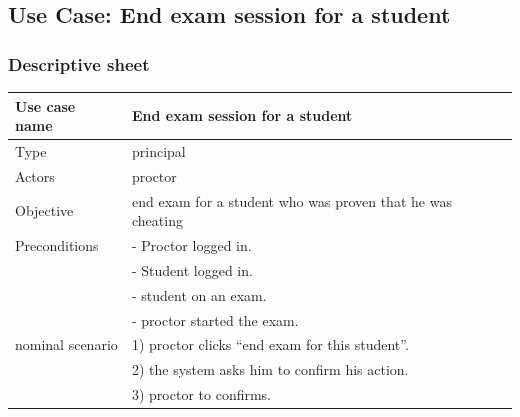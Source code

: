 \documentclass[]{uc2pfecaneva}
\begin{document}
    \thispagestyle{empty}
    \begin{table}[h]
        \raggedright\subsection{Use Case: End exam session for a student}
        \subsubsection{Descriptive sheet}
        \centering
        \begin{tabularx}{\textwidth}{|l|X|}
            \hline
            Use case name         & End exam session for a student                                                                                                \\ \hline
            Type                  & principal                                                                                                              \\ \hline
            Actors                & proctor                                                                                                                \\ \hline
            Objective             & end exam for a student who was proven that he was cheating                                                             \\ \hline
            Preconditions
            & - Proctor logged in.                                                                                                   \\
            & - Student logged in.                                                                                                   \\
            & - student on an exam.                                                                                                  \\
            & - proctor started the exam.                                                                                            \\ \hline
            nominal scenario
            & 1) proctor clicks “end exam for this student”.                                                                         \\
            & 2) the system asks him to confirm his action.                                                                          \\
            & 3) proctor to confirms.                                                                                                \\

\end{tabularx}
\end{table}
\end{document}
